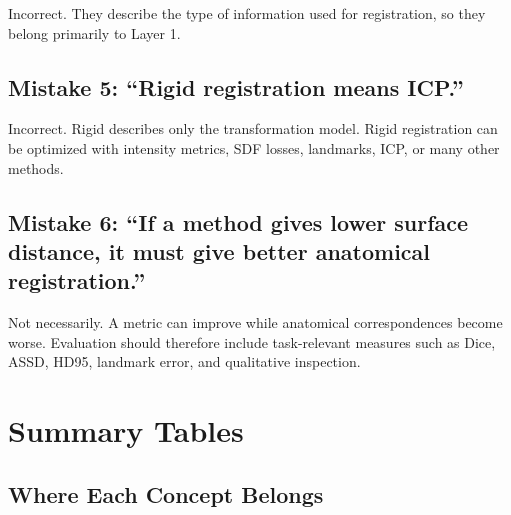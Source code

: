 \documentclass[11pt,a4paper]{article}
\begin{document}
Incorrect. They describe the type of information used for registration, so they belong primarily to Layer 1.

\subsection{Mistake 5: ``Rigid registration means ICP.''}

Incorrect. Rigid describes only the transformation model. Rigid registration can be optimized with intensity metrics, SDF losses, landmarks, ICP, or many other methods.

\subsection{Mistake 6: ``If a method gives lower surface distance, it must give better anatomical registration.''}

Not necessarily. A metric can improve while anatomical correspondences become worse. Evaluation should therefore include task-relevant measures such as Dice, ASSD, HD95, landmark error, and qualitative inspection.

\section{Summary Tables}

\subsection{Where Each Concept Belongs}
\end{document}
